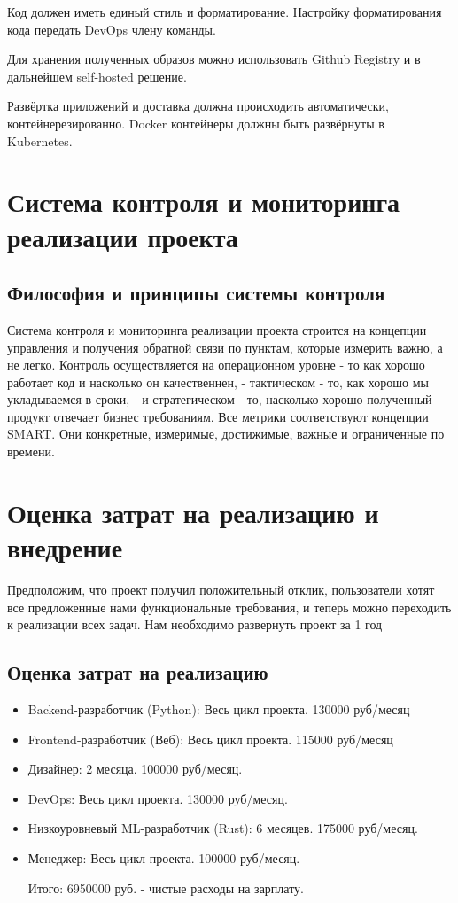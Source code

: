\documentclass[a4paper,14pt]{extarticle}
\begin{document}
Код должен иметь единый стиль и форматирование. Настройку форматирования кода передать
DevOps члену команды.

Для хранения полученных образов можно использовать Github Registry и в дальнейшем
self-hosted решение. 

Развёртка приложений и доставка должна происходить автоматически, контейнерезированно. 
Docker контейнеры должны быть развёрнуты в Kubernetes. 
\section{Система контроля и мониторинга реализации проекта}
\subsection{Философия и принципы системы контроля}
Система контроля и мониторинга реализации проекта строится на концепции управления и получения обратной связи
по пунктам, которые измерить важно, а не легко. Контроль осуществляется на операционном уровне - то как хорошо
работает код и насколько он качественнен, - тактическом - то, как хорошо мы укладываемся в сроки, - и стратегическом
 - то, насколько хорошо полученный продукт отвечает бизнес требованиям. Все метрики соответствуют концепции SMART. Они 
конкретные, измеримые, достижимые, важные и ограниченные по времени.

\section{Оценка затрат на реализацию и внедрение}

Предположим, что проект получил положительный отклик, пользователи хотят все предложенные 
нами функциональные требования, и теперь можно переходить к реализации всех задач. Нам 
необходимо развернуть проект за 1 год

\subsection{Оценка затрат на реализацию}
\begin{itemize}
    \item Backend-разработчик (Python): Весь цикл проекта. 130000 руб/месяц
    \item Frontend-разработчик (Веб): Весь цикл проекта. 115000 руб/месяц
    \item Дизайнер: 2 месяца. 100000 руб/месяц.
    \item DevOps: Весь цикл проекта. 130000 руб/месяц.
    \item Низкоуровневый ML-разработчик (Rust): 6 месяцев. 175000 руб/месяц.
    \item Менеджер: Весь цикл проекта. 100000 руб/месяц.
    
    Итого: 6950000 руб. - чистые расходы на зарплату.
\end{itemize}
\end{document}
